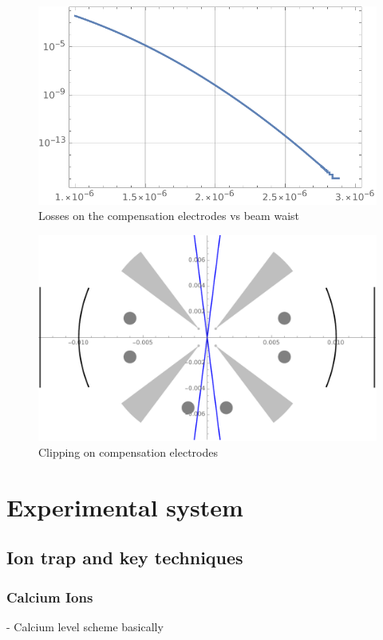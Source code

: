\documentclass[english, a4paper, 12pt, twoside]{article}
\numberwithin{equation}{section} %
\begin{document}
\begin{figure}[H]
\centering
\includegraphics[width=\textwidth]{img/Plosses}
\caption{Losses on the compensation electrodes vs beam waist}
\end{figure}
\begin{figure}[H]
\centering
\includegraphics[width=\textwidth]{img/clipping}
\caption{Clipping on compensation electrodes}
\end{figure}

\section{Experimental system}
\subsection{Ion trap and key techniques}
\subsubsection{Calcium Ions}
- Calcium level scheme basically
\end{document}
